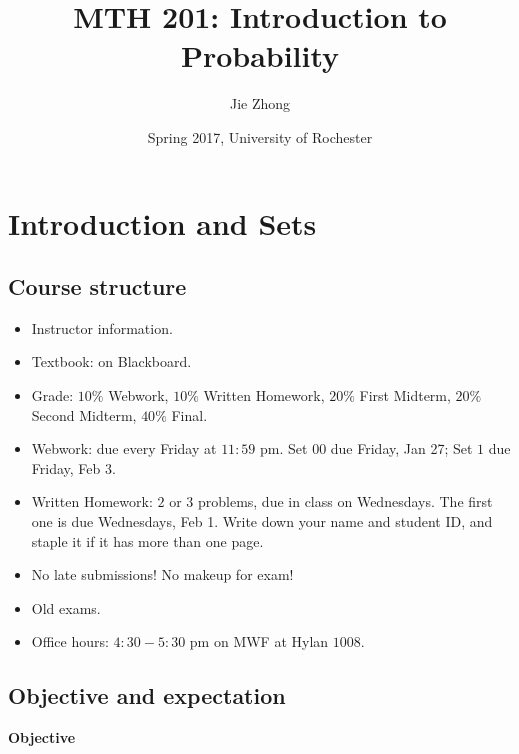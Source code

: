 


	\title{\bf{MTH 201: Introduction to Probability}}
	\date{Spring 2017, University of Rochester}
	\author{Jie Zhong}



	\maketitle
	\newpage
	\tableofcontents
	\newpage


\section{Introduction and Sets} 
  \subsection{Course structure}
  \label{subsec:course}
  \begin{itemize}
  \item Instructor information.
  \item Textbook: on Blackboard.
  \item Grade: $10\%$ Webwork, $10\%$ Written Homework, $20\%$ First Midterm,
    $20\%$ Second Midterm, $40\%$ Final.
  \item Webwork: due every Friday at $11:59$ pm. Set $00$ due Friday, Jan 27;
    Set $1$ due Friday, Feb 3.
  \item Written Homework: $2$ or $3$ problems, due in class on Wednesdays. The
    first one is due Wednesdays, Feb 1. Write down your name and student ID, and
    staple it if it has more than one page.
  \item No late submissions! No makeup for exam!
  \item Old exams.
  \item Office hours: $4:30-5:30$ pm on MWF at Hylan $1008$.
  \end{itemize}
  \subsection{Objective and expectation}
  \label{subsec:objective}
  \textbf{Objective}

